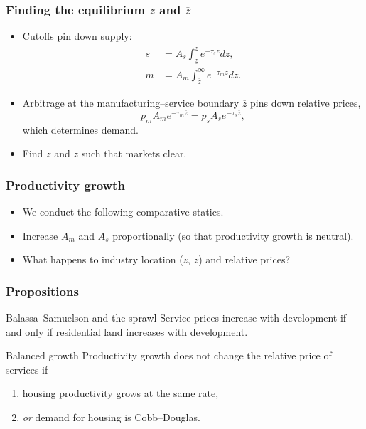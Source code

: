 \documentclass[compress,mathserif]{beamer}
\newcounter{perc}
\newcounter{percek}
\renewcommand{\time}[1]{\addtocounter{percek}{#1}}
\begin{document}
\begin{frame}\frametitle{Finding the equilibrium $\underline{z}$ and $\overline{z}$}
\begin{itemize}
    \item Cutoffs pin down supply:
    \begin{align*}
    s &= A_s\int_{\underline{z}}^{\overline{z}}{e}^{-\tau_s z} dz, \\
    m &= A_m\int_{\overline{z}}^{\infty}{e}^{-\tau_m z} dz .
    \end{align*}
    \item Arbitrage at the manufacturing--service boundary $\overline{z}$ pins down relative prices,
    \[
    p_mA_m{e}^{-\tau_m \overline{z}} = p_sA_s{e}^{-\tau_s \overline{z}},
    \]
    which determines demand.
    \item Find $\underline{z}$ and $\overline{z}$ such that markets clear.
\end{itemize}
\end{frame}
\time 2


\begin{frame}\frametitle{Productivity growth}
\begin{itemize}
\item We conduct the following comparative statics.
\item Increase $A_m$ and $A_s$ proportionally (so that productivity growth is neutral).
\item What happens to industry location ($\underline{z}$, $\overline{z}$) and relative prices?
\end{itemize}
\end{frame}
\time 1

\begin{frame}\frametitle{Propositions}

\begin{block}{Balassa--Samuelson and the sprawl}
Service prices increase with development if and only if residential land increases with development.
\end{block}
\pause

\begin{block}{Balanced growth}
Productivity growth does not change the relative price of services if
    \begin{enumerate}
      \item housing productivity grows at the same rate,
      \item \emph{or} demand for housing is Cobb--Douglas.
    \end{enumerate}
\end{block}
\end{frame}
\time 3
\end{document}
